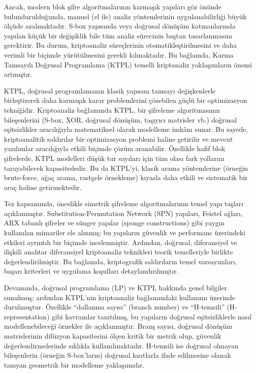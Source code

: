 Ancak, modern blok şifre algoritmalarının karmaşık yapıları göz önünde bulundurulduğunda, manuel (el ile) analiz yöntemlerinin uygulanabilirliği büyük ölçüde azalmaktadır. S-box yapısında veya doğrusal dönüşüm katmanlarında yapılan küçük bir değişiklik bile tüm analiz sürecinin baştan tasarlanmasını gerektirir. Bu durum, kriptoanaliz süreçlerinin otomatikleştirilmesini ve daha verimli bir biçimde yürütülmesini gerekli kılmaktadır. Bu bağlamda, Karma Tamsayılı Doğrusal Programlama (KTPL) temelli kriptanaliz yaklaşımların önemi artmıştır.

KTPL, doğrusal programlamanın klasik yapısını tamsayı değişkenlerle birleştirerek daha karmaşık karar problemlerini çözebilen güçlü bir optimizasyon tekniğidir. Kriptoanaliz bağlamında KTPL, bir şifreleme algoritmasının bileşenlerini (S-box, XOR, doğrusal dönüşüm, taşıyıcı matrisler vb.) doğrusal eşitsizlikler aracılığıyla matematiksel olarak modelleme imkânı sunar. Bu sayede, kriptoanalitik saldırılar bir optimizasyon problemi haline getirilir ve mevcut yazılımlar aracılığıyla etkili biçimde çözüm aranabilir. Özellikle hafif blok şifrelerde, KTPL modelleri düşük tur sayıları için tüm olası fark yollarını tarayabilecek kapasitededir. Bu da KTPL'yi, klasik arama yöntemlerine (örneğin brute-force, ağaç arama, rastgele örnekleme) kıyasla daha etkili ve sistematik bir araç haline getirmektedir.

Tez kapsamında, öncelikle simetrik şifreleme algoritmalarının temel yapı taşları açıklanmıştır. Substitution-Permutation Network (SPN) yapıları, Feistel ağları, ARX tabanlı şifreler ve sünger yapılar (sponge constructions) gibi yaygın kullanılan mimariler ele alınmış; bu yapıların güvenlik ve performans üzerindeki etkileri ayrıntılı bir biçimde incelenmiştir. Ardından, doğrusal, diferansiyel ve ilişkili anahtar diferansiyel kriptoanaliz teknikleri teorik temelleriyle birlikte değerlendirilmiştir. Bu bağlamda, kriptografik saldırıların temel varsayımları, başarı kriterleri ve uygulama koşulları detaylandırılmıştır.

Devamında, doğrusal programlama (LP) ve KTPL hakkında genel bilgiler sunulmuş; ardından KTPL’nin kriptoanaliz bağlamındaki kullanımı üzerinde durulmuştur. Özellikle “dallanma sayısı” (branch number) ve “H-temsili” (H-representation) gibi kavramlar tanıtılmış, bu yapıların doğrusal eşitsizliklerle nasıl modellenebileceği örnekler ile açıklanmıştır. Branş sayısı, doğrusal dönüşüm matrislerinin difüzyon kapasitesini ölçen kritik bir metrik olup, güvenlik değerlendirmelerinde sıklıkla kullanılmaktadır. H-temsili ise doğrusal olmayan bileşenlerin (örneğin S-box’ların) doğrusal kısıtlarla ifade edilmesine olanak tanıyan geometrik bir modelleme yaklaşımıdır.

